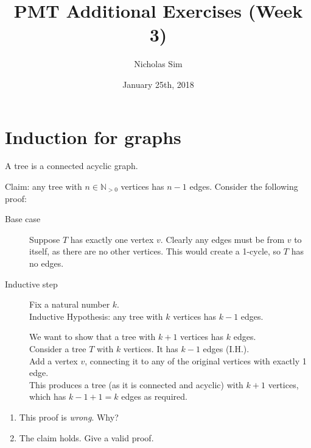 \documentclass[10pt,a4paper]{article}
\begin{document}
\title{PMT Additional Exercises (Week 3)}
\author{Nicholas Sim}
\date{January 25th, 2018}
\maketitle{}



\section{Induction for graphs}
A tree is a connected acyclic graph.

Claim: any tree with \(n \in \mathbb{N}_{>0}\) vertices has \(n-1\) edges.
Consider the following proof:

\begin{framed}
\begin{description}
    \item[Base case] Suppose \(T\) has exactly one vertex \(v\).
    Clearly any edges must be from \(v\) to itself, as there are no other vertices.
    This would create a 1-cycle, so \(T\) has no edges.

    \item[Inductive step] Fix a natural number \(k\).\\
    Inductive Hypothesis: any tree with \(k\) vertices has \(k-1\) edges.

    We want to show that a tree with \(k+1\) vertices has \(k\) edges.\\
    Consider a tree \(T\) with \(k\) vertices.
    It has \(k-1\) edges (I.H.).\\
    Add a vertex \(v\), connecting it to any of the original vertices with exactly 1 edge.\\
    This produces a tree (as it is connected and acyclic) with \(k+1\) vertices, which has \(k-1+1=k\) edges as required.
\end{description}
\end{framed}

\begin{enumerate}
    \item This proof is \emph{wrong}. Why?
    \item The claim holds. Give a valid proof.
\end{enumerate}

\newpage
\end{document}
